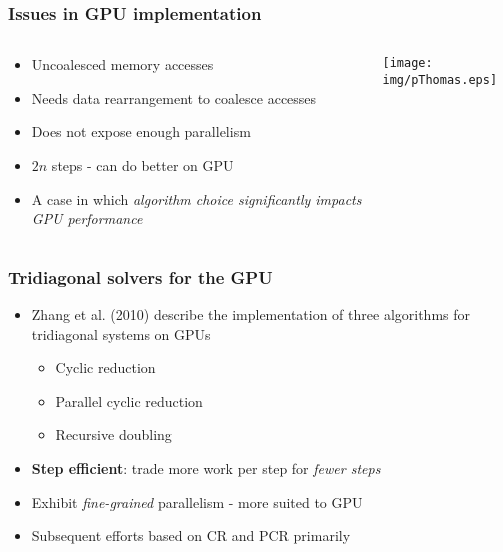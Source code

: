 \begin{frame}
\frametitle{Issues in GPU implementation}
\begin{columns}
\begin{column}{0.5\textwidth}
\begin{itemize}
    \item Uncoalesced memory accesses
    \item Needs data rearrangement to coalesce accesses
    \item Does not expose enough parallelism
    \item $2n$ steps - can do better on GPU
    \item A case in which \emph{algorithm choice
        significantly impacts GPU performance}
\end{itemize}
\end{column}
\begin{column}{0.5\textwidth}
    \texttt{[image: img/pThomas.eps]}
\end{column}
\end{columns}
\end{frame}

\begin{frame}
\frametitle{Tridiagonal solvers for the GPU}
\begin{itemize}
\item Zhang et al. (2010) describe the implementation
    of three algorithms for tridiagonal systems on GPUs
    \begin{itemize}
        \item Cyclic reduction
        \item Parallel cyclic reduction
        \item Recursive doubling
    \end{itemize}
\item \textbf{Step efficient}: trade more work per step for \emph{fewer steps}
\item Exhibit \emph{fine-grained} parallelism - more suited to GPU
\item Subsequent efforts based on CR and PCR primarily
\end{itemize}
\end{frame}

